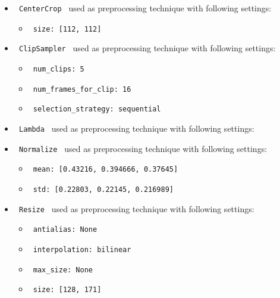 \documentclass[11pt]{article}
\begin{document}
\begin{itemize}
    \item
     \verb| CenterCrop | used as preprocessing technique with following settings:
     \begin{itemize}
             \item
            \verb| size: [112, 112]|
           \end{itemize}
    \item
     \verb| ClipSampler | used as preprocessing technique with following settings:
     \begin{itemize}
             \item
            \verb| num_clips: 5|
             \item
            \verb| num_frames_for_clip: 16|
             \item
            \verb| selection_strategy: sequential|
           \end{itemize}
    \item
     \verb| Lambda | used as preprocessing technique with following settings:
     \begin{itemize}
           \end{itemize}
    \item
     \verb| Normalize | used as preprocessing technique with following settings:
     \begin{itemize}
             \item
            \verb| mean: [0.43216, 0.394666, 0.37645]|
             \item
            \verb| std: [0.22803, 0.22145, 0.216989]|
           \end{itemize}
    \item
     \verb| Resize | used as preprocessing technique with following settings:
     \begin{itemize}
             \item
            \verb| antialias: None|
             \item
            \verb| interpolation: bilinear|
             \item
            \verb| max_size: None|
             \item
            \verb| size: [128, 171]|
           \end{itemize}
\end{itemize}
\hfill\break
\hfill\break
\end{document}

